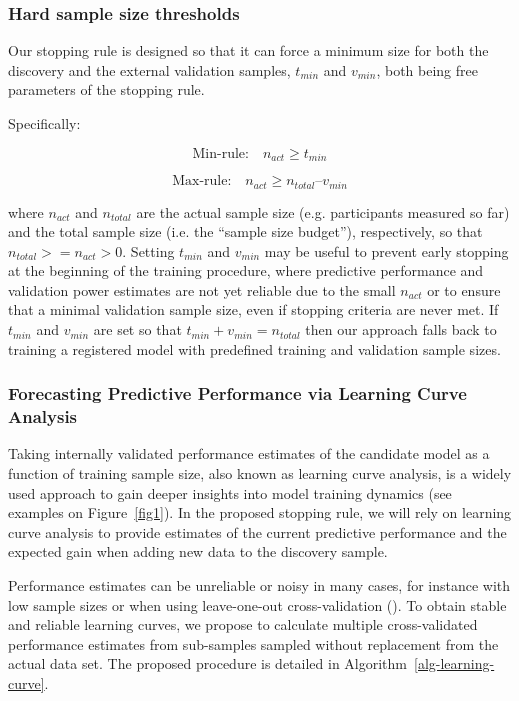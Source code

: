 \documentclass{article}
\begin{document}
\subsubsection{\textbf{Hard sample size thresholds}}

Our stopping rule is designed so that it can force a minimum size for both the discovery and the external validation samples, $t_{min}$ and $v_{min}$, both being free parameters of the stopping rule.

Specifically:

\begin{equation}
\label{eq-min-rule}
    \text{Min-rule:} \quad n_{act} \geq t_{min}
\end{equation}

\begin{equation}
\label{eq-max-rule}
    \text{Max-rule:} \quad n_{act} \geq n_{total} – v_{min}
\end{equation}

where $n_{act}$ and $n_{total}$ are the actual sample size (e.g. participants measured so far) and the total sample size (i.e. the ``sample size budget''), respectively, so that $n_{total} >= n_{act} > 0$.
Setting $t_{min}$ and $v_{min}$ may be useful to prevent early stopping at the beginning of the training procedure, where predictive performance and validation power estimates are not yet reliable due to the small $n_{act}$ or to ensure that a minimal validation sample size, even if stopping criteria are never met. If $t_{min}$ and $v_{min}$ are set so that $t_{min} + v_{min} = n_{total}$ then our approach falls back to training a registered model with predefined training and validation sample sizes.

\subsubsection{\textbf{Forecasting Predictive Performance via Learning Curve Analysis}}

Taking internally validated  performance estimates of the candidate model as a function of training sample size, also known as learning curve analysis, is a widely used approach to gain deeper insights into model training dynamics (see examples on Figure~\ref{fig1}). In the proposed stopping rule, we will rely on learning curve analysis to provide estimates of the current predictive performance and the expected gain when adding new data to the discovery sample.

Performance estimates can be unreliable or noisy in many cases, for instance with low sample sizes or when using leave-one-out cross-validation (\cite{Varoquaux_2018}). To obtain stable and reliable learning curves, we propose to calculate multiple cross-validated performance estimates from sub-samples sampled without replacement from the actual data set. The proposed procedure is detailed in Algorithm~\ref{alg-learning-curve}.
\end{document}
